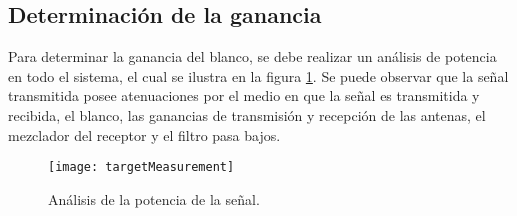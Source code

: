 


\subsection{Determinación de la ganancia}


Para determinar la ganancia del blanco, se debe realizar un análisis de potencia en todo el sistema, el cual se ilustra en la figura  \ref{fig:powerAnalysis}. Se puede observar que la señal transmitida posee atenuaciones por el medio en que la señal es transmitida y recibida, el blanco, las ganancias de transmisión y recepción de las antenas, el mezclador del receptor y el filtro pasa bajos. 

\begin{figure}
 \centering
 \texttt{[image: targetMeasurement]}
 \caption{Análisis de la potencia de la señal.}
 \label{fig:powerAnalysis}
\end{figure}

